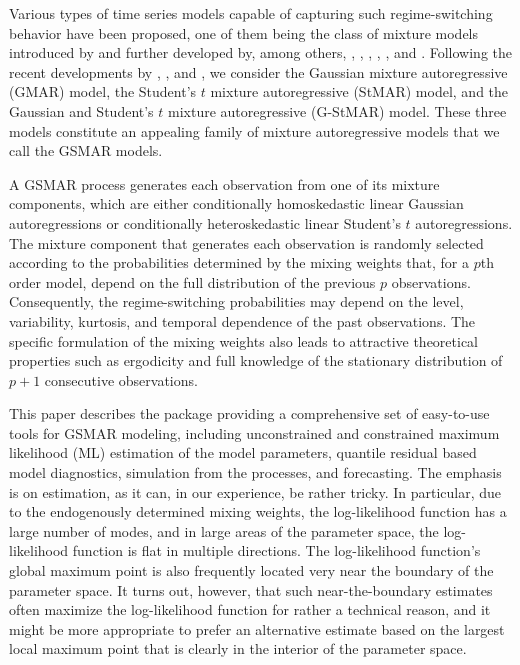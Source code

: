 \documentclass[nojss]{jss} %
\begin{document}
Various types of time series models capable of capturing such regime-switching behavior have been proposed, one of them being the class of mixture models introduced by \cite{Le+Martin+Raftery:1996} and further developed by, among others, \cite{Wong+Li:2000, Wong+Li:2001, Wong+Li2:2001}, \cite{Glasbey:2001}, \cite{Lanne+Saikkonen:2003}, \cite{Kalliovirta+Meitz+Saikkonen:2015}, \cite{Meitz+Preve+Saikkonen:2021}, and \cite{Virolainen:2020}. Following the recent developments by \cite{Kalliovirta+Meitz+Saikkonen:2015}, \cite{Meitz+Preve+Saikkonen:2021}, and \cite{Virolainen:2020}, we consider the Gaussian mixture autoregressive (GMAR) model, the Student's $t$ mixture autoregressive (StMAR) model, and the Gaussian and Student's $t$ mixture autoregressive (G-StMAR) model. These three models constitute an appealing family of mixture autoregressive models that we call the GSMAR models.

A GSMAR process generates each observation from one of its mixture components, which are either conditionally homoskedastic linear Gaussian autoregressions or conditionally heteroskedastic linear Student's $t$ autoregressions. The mixture component that generates each observation is randomly selected according to the probabilities determined by the mixing weights that, for a $p$th order model, depend on the full distribution of the previous $p$ observations. Consequently, the regime-switching probabilities may depend on the level, variability, kurtosis, and temporal dependence of the past observations. The specific formulation of the mixing weights also leads to attractive theoretical properties such as ergodicity and full knowledge of the stationary distribution of $p+1$ consecutive observations.

This paper describes the  package  providing a comprehensive set of easy-to-use tools for GSMAR modeling, including unconstrained and constrained maximum likelihood (ML) estimation of the model parameters, quantile residual based model diagnostics, simulation from the processes, and forecasting. The emphasis is on estimation, as it can, in our experience, be rather tricky. In particular, due to the endogenously determined mixing weights, the log-likelihood function has a large number of modes, and in large areas of the parameter space, the log-likelihood function is flat in multiple directions. The log-likelihood function's global maximum point is also frequently located very near the boundary of the parameter space. It turns out, however, that such near-the-boundary estimates often maximize the log-likelihood function for rather a technical reason, and it might be more appropriate to prefer an alternative estimate based on the largest local maximum point that is clearly in the interior of the parameter space.
\end{document}
